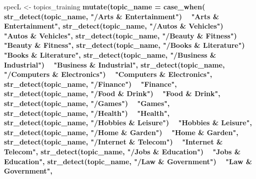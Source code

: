 \documentclass[]{article}
\newenvironment{Shaded}{\begin{snugshade}}{\end{snugshade}}
\newcommand{\DataTypeTok}[1]{\textcolor[rgb]{0.13,0.29,0.53}{#1}}
\newcommand{\KeywordTok}[1]{\textcolor[rgb]{0.13,0.29,0.53}{\textbf{#1}}}
\newcommand{\NormalTok}[1]{#1}
\newcommand{\OperatorTok}[1]{\textcolor[rgb]{0.81,0.36,0.00}{\textbf{#1}}}
\newcommand{\StringTok}[1]{\textcolor[rgb]{0.31,0.60,0.02}{#1}}
\begin{document}
\begin{Shaded}
\begin{Highlighting}[]
\NormalTok{specL <-}\StringTok{ }\NormalTok{topics_training }\OperatorTok{%
\StringTok{  }\KeywordTok{mutate}\NormalTok{(}\DataTypeTok{topic_name =} \KeywordTok{case_when}\NormalTok{(}
    \KeywordTok{str_detect}\NormalTok{(topic_name, }\StringTok{"/Arts & Entertainment"}\NormalTok{) }\OperatorTok{~}\StringTok{ "Arts & Entertainment"}\NormalTok{,}
    \KeywordTok{str_detect}\NormalTok{(topic_name, }\StringTok{"/Autos & Vehicles"}\NormalTok{) }\OperatorTok{~}\StringTok{ "Autos & Vehicles"}\NormalTok{,}
    \KeywordTok{str_detect}\NormalTok{(topic_name, }\StringTok{"/Beauty & Fitness"}\NormalTok{) }\OperatorTok{~}\StringTok{ "Beauty & Fitness"}\NormalTok{,}
    \KeywordTok{str_detect}\NormalTok{(topic_name, }\StringTok{"/Books & Literature"}\NormalTok{) }\OperatorTok{~}\StringTok{ "Books & Literature"}\NormalTok{,}
    \KeywordTok{str_detect}\NormalTok{(topic_name, }\StringTok{"/Business & Industrial"}\NormalTok{) }\OperatorTok{~}\StringTok{ "Business & Industrial"}\NormalTok{,}
    \KeywordTok{str_detect}\NormalTok{(topic_name, }\StringTok{"/Computers & Electronics"}\NormalTok{) }\OperatorTok{~}\StringTok{ "Computers & Electronics"}\NormalTok{,}
    \KeywordTok{str_detect}\NormalTok{(topic_name, }\StringTok{"/Finance"}\NormalTok{) }\OperatorTok{~}\StringTok{ "Finance"}\NormalTok{,}
    \KeywordTok{str_detect}\NormalTok{(topic_name, }\StringTok{"/Food & Drink"}\NormalTok{) }\OperatorTok{~}\StringTok{ "Food & Drink"}\NormalTok{,}
    \KeywordTok{str_detect}\NormalTok{(topic_name, }\StringTok{"/Games"}\NormalTok{) }\OperatorTok{~}\StringTok{ "Games"}\NormalTok{,}
    \KeywordTok{str_detect}\NormalTok{(topic_name, }\StringTok{"/Health"}\NormalTok{) }\OperatorTok{~}\StringTok{ "Health"}\NormalTok{,}
    \KeywordTok{str_detect}\NormalTok{(topic_name, }\StringTok{"/Hobbies & Leisure"}\NormalTok{) }\OperatorTok{~}\StringTok{ "Hobbies & Leisure"}\NormalTok{,}
    \KeywordTok{str_detect}\NormalTok{(topic_name, }\StringTok{"/Home & Garden"}\NormalTok{) }\OperatorTok{~}\StringTok{ "Home & Garden"}\NormalTok{,}
    \KeywordTok{str_detect}\NormalTok{(topic_name, }\StringTok{"/Internet & Telecom"}\NormalTok{) }\OperatorTok{~}\StringTok{ "Internet & Telecom"}\NormalTok{,}
    \KeywordTok{str_detect}\NormalTok{(topic_name, }\StringTok{"/Jobs & Education"}\NormalTok{) }\OperatorTok{~}\StringTok{ "Jobs & Education"}\NormalTok{,}
    \KeywordTok{str_detect}\NormalTok{(topic_name, }\StringTok{"/Law & Government"}\NormalTok{) }\OperatorTok{~}\StringTok{ "Law & Government"}\NormalTok{,}
}
\end{Highlighting}
\end{Shaded}
\end{document}
